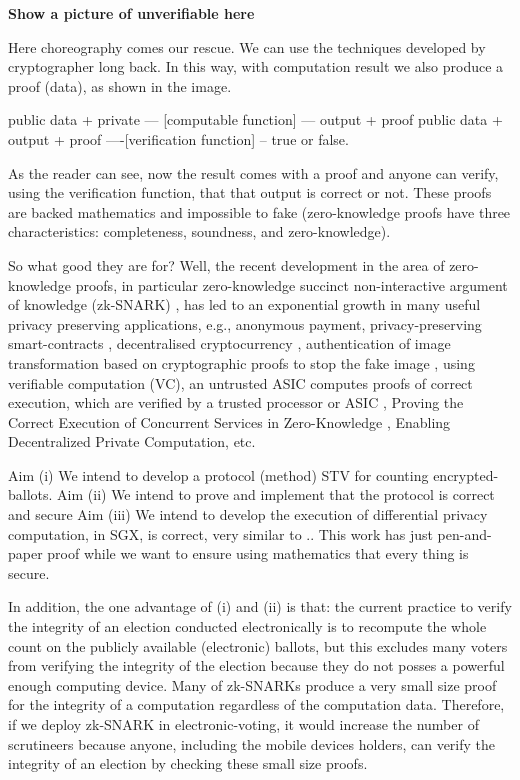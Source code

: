\documentclass[12pt,a4paper]{article}
\begin{document}
\textbf {Show a picture of unverifiable here} 

Here choreography comes our rescue. We can use the 
techniques developed by cryptographer long back. 
In this way, with computation result  we also 
produce a proof (data), as shown in the image. 

  public data + private --- [computable function] --- output + proof 
  public data + output + proof ----[verification function] -- true or false. 

As the reader can see, now the result comes with a proof and 
anyone can verify, using the verification function, that 
that output is correct or not. These proofs are backed 
mathematics and impossible to fake (zero-knowledge proofs 
have three characteristics: completeness, soundness, and zero-knowledge). 

So what good they are for? Well, the recent development in the area of zero-knowledge proofs, 
in particular zero-knowledge succinct non-interactive argument of knowledge (zk-SNARK) 
\cite{10.1007/978-3-642-17373-8_19, 10.1007/978-3-642-38348-9_37, 
ben2013snarks, parno2016pinocchio, groth2016size, 10.1007/978-3-642-36594-2_18,
10.1007/978-3-662-44381-1_16, 8418611, 10.1007/978-3-030-17653-2_4, 10.1145/3319535.3339817,
cryptoeprint:2019/953, 10.1007/978-3-030-45721-1_26, 10.1007/978-3-030-56877-1_25}, 
has led to an exponential growth in many useful privacy preserving 
applications, e.g., anonymous payment\cite{6956581},  
privacy-preserving smart-contracts \cite{7546538},  
decentralised cryptocurrency \cite{cryptoeprint:2020/352}, 
authentication of image transformation based on cryptographic proofs to 
stop the fake image \cite{7546506}, using verifiable computation (VC), an untrusted ASIC computes 
proofs of correct execution, which are verified by a trusted processor or ASIC \cite{7546534},
Proving the Correct Execution of Concurrent Services in Zero-Knowledge \cite{222621},
Enabling Decentralized Private Computation\cite{9152634, cryptoeprint:2022/802}, etc.  


Aim (i) We intend to develop a protocol (method) STV for counting encrypted-ballots.
Aim (ii) We intend to prove and implement that the protocol is correct and secure
Aim (iii) We intend to develop the execution of differential privacy computation, 
in SGX, is correct, very similar to .. This work has just pen-and-paper proof 
while we want to ensure using mathematics that every thing is secure. 


In addition, the one advantage of (i) and (ii) is that: the 
current practice to verify the integrity of an election conducted electronically is to
recompute the whole count on the publicly available (electronic) ballots, but
this excludes many voters from verifying the integrity of the election because
they do not posses a powerful enough computing device. Many of
zk-SNARKs produce a very small size proof for the integrity of a computation
regardless of the computation data. Therefore, if we deploy zk-SNARK in
electronic-voting, it would increase the number of scrutineers because anyone, including the
mobile devices holders, can verify the integrity of an election by checking these small size proofs.
\end{document}
